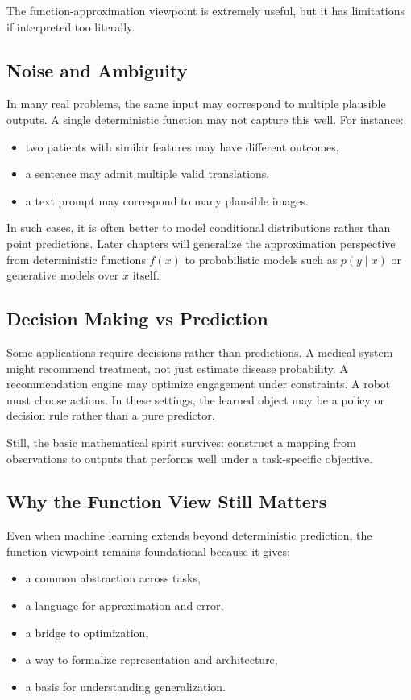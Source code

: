 The function-approximation viewpoint is extremely useful, but it has limitations if interpreted too literally.

\subsection{Noise and Ambiguity}

In many real problems, the same input may correspond to multiple plausible outputs. A single deterministic function may not capture this well. For instance:
\begin{itemize}
    \item two patients with similar features may have different outcomes,
    \item a sentence may admit multiple valid translations,
    \item a text prompt may correspond to many plausible images.
\end{itemize}

In such cases, it is often better to model conditional distributions rather than point predictions. Later chapters will generalize the approximation perspective from deterministic functions $f(x)$ to probabilistic models such as $p(y\mid x)$ or generative models over $x$ itself.

\subsection{Decision Making vs Prediction}

Some applications require decisions rather than predictions. A medical system might recommend treatment, not just estimate disease probability. A recommendation engine may optimize engagement under constraints. A robot must choose actions. In these settings, the learned object may be a policy or decision rule rather than a pure predictor.

Still, the basic mathematical spirit survives: construct a mapping from observations to outputs that performs well under a task-specific objective.

\subsection{Why the Function View Still Matters}

Even when machine learning extends beyond deterministic prediction, the function viewpoint remains foundational because it gives:
\begin{itemize}
    \item a common abstraction across tasks,
    \item a language for approximation and error,
    \item a bridge to optimization,
    \item a way to formalize representation and architecture,
    \item a basis for understanding generalization.
\end{itemize}


